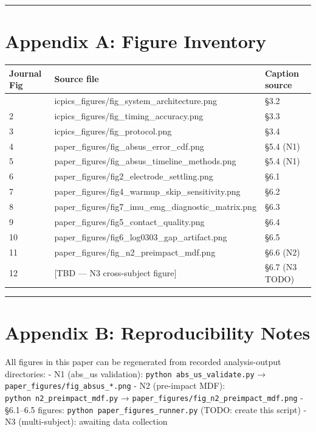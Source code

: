 \documentclass[sensors,article,submit,pdftex,moreauthors]{Definitions/mdpi}
\newcounter{none}  %
\begin{document}
\begin{center}\rule{0.5\linewidth}{0.5pt}\end{center}

\section{Appendix A: Figure Inventory}\label{appendix-a-figure-inventory}

{\def\LTcaptype{none} %
\begin{longtable}[]{@{}lll@{}}
\toprule\noalign{}
Journal Fig & Source file & Caption source \\
\midrule\noalign{}
\endhead
\bottomrule\noalign{}
\endlastfoot
1 & icpics\_figures/fig\_system\_architecture.png & §3.2 \\
2 & icpics\_figures/fig\_timing\_accuracy.png & §3.3 \\
3 & icpics\_figures/fig\_protocol.png & §3.4 \\
4 & paper\_figures/fig\_absus\_error\_cdf.png & §5.4 (N1) \\
5 & paper\_figures/fig\_absus\_timeline\_methods.png & §5.4 (N1) \\
6 & paper\_figures/fig2\_electrode\_settling.png & §6.1 \\
7 & paper\_figures/fig4\_warmup\_skip\_sensitivity.png & §6.2 \\
8 & paper\_figures/fig7\_imu\_emg\_diagnostic\_matrix.png & §6.3 \\
9 & paper\_figures/fig5\_contact\_quality.png & §6.4 \\
10 & paper\_figures/fig6\_log0303\_gap\_artifact.png & §6.5 \\
11 & paper\_figures/fig\_n2\_preimpact\_mdf.png & §6.6 (N2) \\
12 & {[}TBD --- N3 cross-subject figure{]} & §6.7 (N3 TODO) \\
\end{longtable}
}

\begin{center}\rule{0.5\linewidth}{0.5pt}\end{center}

\section{Appendix B: Reproducibility Notes}\label{appendix-b-reproducibility-notes}

All figures in this paper can be regenerated from recorded analysis-output directories:
- N1 (abs\_us validation): \texttt{python\ abs\_us\_validate.py} → \texttt{paper\_figures/fig\_absus\_*.png}
- N2 (pre-impact MDF): \texttt{python\ n2\_preimpact\_mdf.py} → \texttt{paper\_figures/fig\_n2\_preimpact\_mdf.png}
- §6.1--6.5 figures: \texttt{python\ paper\_figures\_runner.py} (TODO: create this script)
- N3 (multi-subject): awaiting data collection
\end{document}
